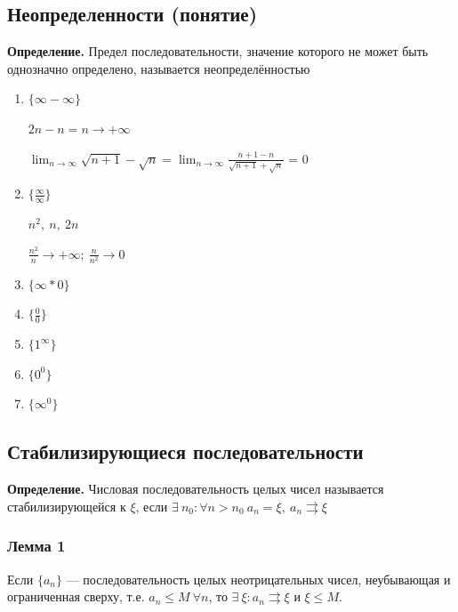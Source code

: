 \documentclass{article}
\begin{document}
    \subsection{Неопределенности (понятие)}
    
    \textbf{Определение.} Предел последовательности, значение которого не может быть однозначно определено, называется неопределённостью

    \begin{enumerate}
    	\item \(\{\infty - \infty\}\)
    	
    	\(2n - n = n \rightarrow +\infty\)
    	
        \(\lim_{n \rightarrow \infty}{\sqrt{n+1} - \sqrt{n}} = \lim_{n \rightarrow \infty}{\frac{n+1-n}{\sqrt{n+1}+\sqrt{n}}}\) = 0

    	\item \(\{\frac{\infty}{\infty}\}\)

    	\( n^2,\ n,\ 2n \)
    
    	\( \frac{n^2}{n}  \rightarrow +\infty;\ \frac{n}{n^2} \rightarrow 0\)

    	\item \(\{\infty * 0\}\)
    	\item \(\{\frac{0}{0}\}\)
    	
    	\item \(\{1^{\infty}\}\)
    	\item \(\{0^0\}\)
    	\item \(\{\infty^0\}\)
    \end{enumerate}
    
    \subsection{Стабилизирующиеся последовательности}
    
    \textbf{Определение.}
    Числовая последовательность целых чисел называется стабилизирующейся к \(\xi\), если \( \exists\ n_0 : \forall n > n_0\  a_n = \xi,\ a_n \rightrightarrows \xi \)
    
    \subsubsection{Лемма 1}
    
    Если \(\{a_n\}\) --- последовательность целых неотрицательных чисел, неубывающая и ограниченная сверху, т.е. \( a_n \leq M\ \forall n\), то \( \exists\ \xi: a_n \rightrightarrows \xi \) и \( \xi \leq M \).
\end{document}
